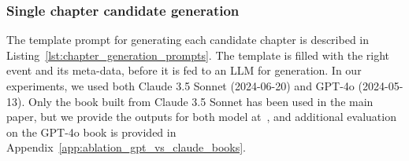 \documentclass{article}
\begin{document}
\subsubsection{Single chapter candidate generation}\label{app:1book:singlechaper_candidate}

The template prompt for generating each candidate chapter is described in Listing~\ref{lst:chapter_generation_prompts}. The template is filled with the right event and its meta-data, before it is fed to an LLM for generation. In our experiments, we used both Claude 3.5 Sonnet (2024-06-20) and GPT-4o (2024-05-13). Only the book built from Claude 3.5 Sonnet has been used in the main paper, but we provide the outputs for both model at~\citet{codeAvailability}, and additional evaluation on the GPT-4o book is provided in Appendix~\ref{app:ablation_gpt_vs_claude_books}.
\end{document}
